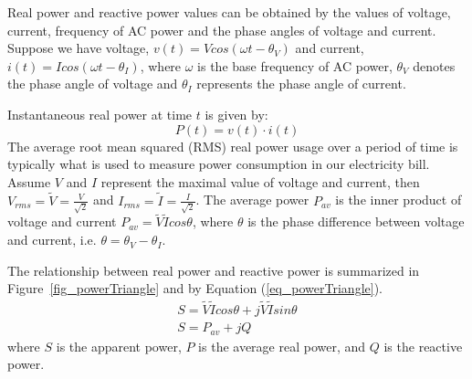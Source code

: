 Real power and reactive power values can be
obtained by the values of voltage, current, frequency of AC power and the phase angles of voltage and current. 
Suppose we have voltage, $v(t)= V cos(\omega t - \theta_V)$ and current, $i(t)= I cos(\omega t - \theta_I)$,
where $\omega$ is the base frequency of AC power,
$\theta_V$ denotes the phase angle of voltage and
$\theta_I$ represents the phase angle of current.

Instantaneous real power at time $t$ is given by:
\begin{equation}
\label{eq_insPower}
P(t)= v(t) \cdot i(t)
\end{equation}
The average root mean squared (RMS) real power usage over a period of time is typically what is
used to measure power consumption in our electricity bill.
Assume $V$ and $I$ represent the maximal value of voltage and current, then
$V_{rms} = \tilde{V} = \frac{V}{\sqrt{2}}$ and $I_{rms} = \tilde{I} = \frac{I}{\sqrt{2}}$.
The average power $P_{av}$ is the inner product of voltage and current $P_{av}=\tilde{V}\tilde{I}cos\theta$, 
where $\theta$ is the phase difference between voltage and current,
i.e. $\theta= \theta_V - \theta_I$.



The relationship between real power and reactive power is summarized in
Figure~\ref{fig_powerTriangle} and by
Equation (\ref{eq_powerTriangle}).
\begin{subequations}
\begin{align}
S=\tilde{V}\tilde{I}cos\theta+ j\tilde{V}\tilde{I}sin\theta \\
S=P_{av}+j Q \label{eq_powerTriangle}
\end{align}
\end{subequations}
\noindent
where $S$ is the apparent power,
$P$ is the average real power,
and $Q$ is the reactive power.


